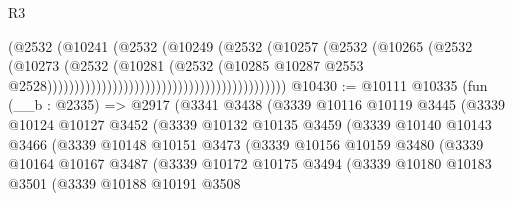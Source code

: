 \begin{lexlean}{R3}
\begin{coremodule}
                                                                (@2532
                                                                  (@10241
                                                                    (@2532
                                                                      (@10249
                                                                        (@2532
                                                                          (@10257
                                                                            (@2532
                                                                              (@10265
                                                                                (@2532
                                                                                  (@10273
                                                                                    (@2532
                                                                                      (@10281
                                                                                        (@2532
                                                                                          (@10285
                                                                                            @10287
                                                                                            @2553
                                                                                            @2528))))))))))))))))))))))))))))))))))))))))))))
@10430 := @10111
    @10335
    (fun (__b : @2335) =>
    @2917
      (@3341
        @3438
        (@3339
          @10116
          @10119
          @3445
          (@3339
            @10124
            @10127
            @3452
            (@3339
              @10132
              @10135
              @3459
              (@3339
                @10140
                @10143
                @3466
                (@3339
                  @10148
                  @10151
                  @3473
                  (@3339
                    @10156
                    @10159
                    @3480
                    (@3339
                      @10164
                      @10167
                      @3487
                      (@3339
                        @10172
                        @10175
                        @3494
                        (@3339
                          @10180
                          @10183
                          @3501
                          (@3339
                            @10188
                            @10191
                            @3508

\end{coremodule}
\end{lexlean}

